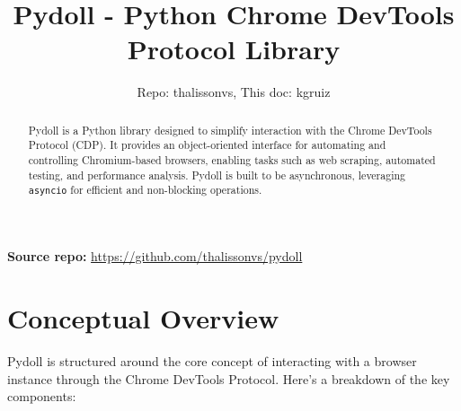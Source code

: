 \documentclass{article}
\title{Pydoll - Python Chrome DevTools Protocol Library}
\author{Repo: thalissonvs, This doc: kgruiz}
\date{}
\begin{document}
\maketitle

\noindent\textbf{Source repo:} \url{https://github.com/thalissonvs/pydoll}

\begin{abstract}
    Pydoll is a Python library designed to simplify interaction with the Chrome DevTools Protocol (CDP). It provides an object-oriented interface for automating and controlling Chromium-based browsers, enabling tasks such as web scraping, automated testing, and performance analysis. Pydoll is built to be asynchronous, leveraging \texttt{asyncio} for efficient and non-blocking operations.
\end{abstract}

\newpage

\tableofcontents

\newpage

\section{Conceptual Overview}

\noindent Pydoll is structured around the core concept of interacting with a browser instance through the Chrome DevTools Protocol. Here's a breakdown of the key components:
\end{document}
